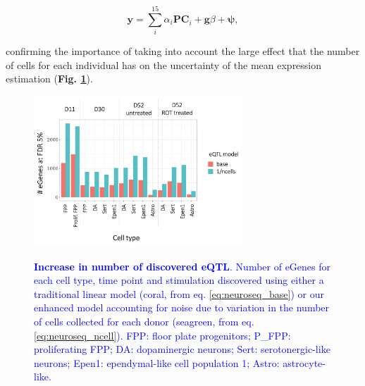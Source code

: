 \begin{equation}\label{eq:neuroseq_base}
    \mathbf{y} = \sum_i^{15}\alpha_i \mathbf{PC}_i + \mathbf{g}\beta + \boldsymbol{\psi},
\end{equation}

confirming the importance of taking into account the large effect that the number of cells for each individual has on the 
uncertainty
of the mean expression estimation (\textbf{Fig. \ref{fig:neuroseq_eqtl_improved_power}}). 


\begin{figure}
\caption[Increase in number of discovered eQTL]{\textcolor{blue}{\textbf{Increase in number of discovered eQTL}.
Number of eGenes for each cell type, time point and stimulation discovered using either a traditional linear model (coral, from eq. \eqref{eq:neuroseq_base}) or our enhanced model accounting for noise due to variation in the number of cells collected for each donor (seagreen, from eq. \eqref{eq:neuroseq_ncell}).
FPP: floor plate progenitors; P\_FPP: proliferating FPP; DA: dopaminergic neurons; Sert: serotonergic-like neurons; Epen1: ependymal-like cell population 1; Astro: astrocyte-like.}}
\includegraphics[width=0.7\textwidth]{Chapter5/Fig/neuroseq_improved_eqtl_power.png}
\label{fig:neuroseq_eqtl_improved_power}
\end{figure}


